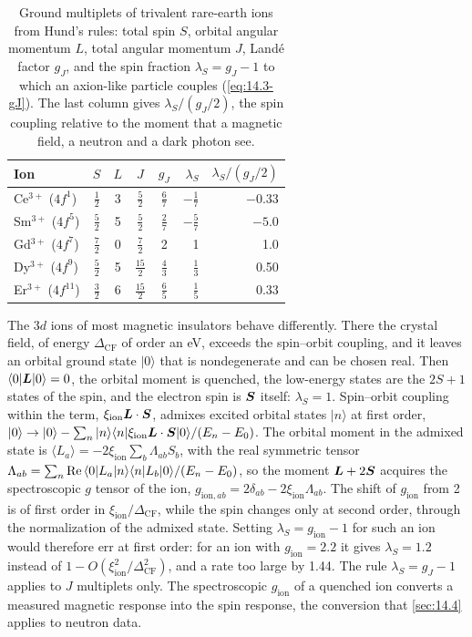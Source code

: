 \begin{table}[tbp]
  \centering
  \caption{Ground multiplets of trivalent rare-earth ions from Hund's rules: total spin $S$, orbital angular momentum $L$, total angular momentum $J$, Landé factor $g_J$, and the spin fraction $\lambda_S = g_J - 1$ to which an axion-like particle couples (\cref{eq:14.3-gJ}). The last column gives $\lambda_S/(g_J/2)$, the spin coupling relative to the moment that a magnetic field, a neutron and a dark photon see.}
  \label{tab:14-lande}
  \begin{tabular}{@{}lccccrr@{}}
    \toprule
    Ion & $S$ & $L$ & $J$ & $g_J$ & $\lambda_S$ & $\lambda_S/(g_J/2)$ \\
    \midrule
    Ce$^{3+}$ ($4f^1$) & $\frac12$ & 3 & $\frac52$ & $\frac67$ & $-\frac17$ & $-0.33$ \\
    Sm$^{3+}$ ($4f^5$) & $\frac52$ & 5 & $\frac52$ & $\frac27$ & $-\frac57$ & $-5.0$ \\
    Gd$^{3+}$ ($4f^7$) & $\frac72$ & 0 & $\frac72$ & 2 & 1 & 1.0 \\
    Dy$^{3+}$ ($4f^9$) & $\frac52$ & 5 & $\frac{15}2$ & $\frac43$ & $\frac13$ & 0.50 \\
    Er$^{3+}$ ($4f^{11}$) & $\frac32$ & 6 & $\frac{15}2$ & $\frac65$ & $\frac15$ & 0.33 \\
    \bottomrule
  \end{tabular}
\end{table}

The $3d$ ions of most magnetic insulators behave differently. There the crystal field, of energy $\Delta_{\mathrm{CF}}$ of order an eV, exceeds the spin--orbit coupling, and it leaves an orbital ground state $|0\rangle$ that is nondegenerate and can be chosen real. Then $\langle0|\bm{L}|0\rangle = 0$, the orbital moment is quenched, the low-energy states are the $2S + 1$ states of the spin, and the electron spin is $\bm{S}$ itself: $\lambda_S = 1$. Spin--orbit coupling within the term, $\xi_{\mathrm{ion}}\bm{L}\cdot\bm{S}$, admixes excited orbital states $|n\rangle$ at first order, $|0\rangle \to |0\rangle - \sum_n|n\rangle\langle n|\xi_{\mathrm{ion}}\bm{L}\cdot\bm{S}|0\rangle/(E_n - E_0)$. The orbital moment in the admixed state is $\langle L_a\rangle = -2\xi_{\mathrm{ion}}\sum_b\Lambda_{ab}S_b$, with the real symmetric tensor $\Lambda_{ab} = \sum_n\operatorname{Re}\,\langle0|L_a|n\rangle\langle n|L_b|0\rangle/(E_n - E_0)$, so the moment $\bm{L} + 2\bm{S}$ acquires the spectroscopic $g$ tensor of the ion, $g_{\mathrm{ion},ab} = 2\delta_{ab} - 2\xi_{\mathrm{ion}}\Lambda_{ab}$. The shift of $g_{\mathrm{ion}}$ from 2 is of first order in $\xi_{\mathrm{ion}}/\Delta_{\mathrm{CF}}$, while the spin changes only at second order, through the normalization of the admixed state. Setting $\lambda_S = g_{\mathrm{ion}} - 1$ for such an ion would therefore err at first order: for an ion with $g_{\mathrm{ion}} = 2.2$ it gives $\lambda_S = 1.2$ instead of $1 - O(\xi_{\mathrm{ion}}^2/\Delta_{\mathrm{CF}}^2)$, and a rate too large by 1.44. The rule $\lambda_S = g_J - 1$ applies to $J$ multiplets only. The spectroscopic $g_{\mathrm{ion}}$ of a quenched ion converts a measured magnetic response into the spin response, the conversion that \cref{sec:14.4} applies to neutron data.

